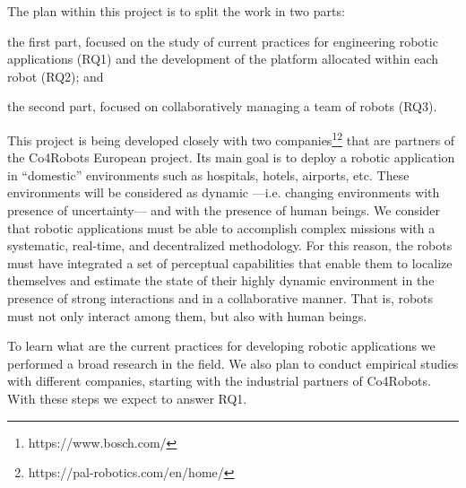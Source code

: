 The plan within this project is to split the work in two parts:
\begin{enumerate*}
\item the first part, focused on the study of current practices for engineering robotic applications (RQ1) and the development of the platform allocated within each robot (RQ2); and
\item the second part, focused on collaboratively managing a team of robots (RQ3).
\end{enumerate*}

This project is being developed closely with two companies\footnote{https://www.bosch.com/}\footnote{https://pal-robotics.com/en/home/} that are partners of the Co4Robots European project.
Its main goal is to deploy a robotic application in ``domestic'' environments such as hospitals, hotels, airports, etc.
These environments will be considered as dynamic ---i.e. changing environments with presence of uncertainty--- and with the presence of human beings.
We consider that robotic applications must be able to accomplish complex missions with a systematic, real-time, and decentralized methodology.
For this reason, the robots must have integrated a set of perceptual capabilities that enable them to localize themselves and estimate the state of their highly dynamic environment in the presence of strong interactions and in a collaborative manner.
That is, robots must not only interact among them, but also with human beings.

To learn what are the current practices for developing robotic applications we performed a broad research in the field.
We also plan to conduct empirical studies with different companies, starting with the industrial partners of Co4Robots.
With these steps we expect to answer RQ1. %




